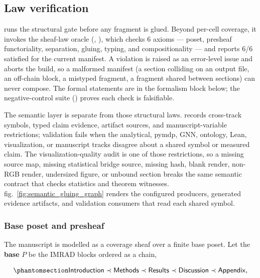 \documentclass[
  english,
]{article}
\begin{document}
\subsection{Law verification}\label{law-verification}

 runs the structural gate before
any fragment is glued. Beyond per-cell coverage, it invokes the
sheaf-law oracle (,
), which checks 6 axioms --- poset,
presheaf functoriality, separation, gluing, typing, and compositionality
--- and reports 6/6 satisfied for the current manifest. A violation is
raised as an error-level issue and aborts the build, so a malformed
manifest (a section colliding on an output file, an off-chain block, a
mistyped fragment, a fragment shared between sections) can never
compose. The formal statements are in the formalism block below; the
negative-control suite () proves each
check is falsifiable.

The semantic layer is separate from those structural laws.
 records cross-track
symbols, typed claim evidence, artifact sources, and manuscript-variable
restrictions; validation fails when the analytical, pymdp, GNN,
ontology, Lean, visualization, or manuscript tracks disagree about a
shared symbol or measured claim. The visualization-quality audit is one
of those restrictions, so a missing source map, missing statistical
bridge source, missing hash, blank render, non-RGB render, undersized
figure, or unbound section breaks the same semantic contract that checks
statistics and theorem witnesses. fig.~\ref{fig:semantic_gluing_graph}
renders the configured producers, generated evidence artifacts, and
validation consumers that read each shared symbol.

\subsubsection{Base poset and presheaf}\label{base-poset-and-presheaf}

The manuscript is modelled as a coverage sheaf over a finite base poset.
Let the \textbf{base} \(P\) be the IMRAD blocks ordered as a chain,

\begin{equation}\protect\phantomsection\label{eq:imrad_chain}{
\mathsf{Introduction} \prec \mathsf{Methods} \prec \mathsf{Results} \prec \mathsf{Discussion} \prec \mathsf{Appendix},
}\end{equation}
\end{document}
